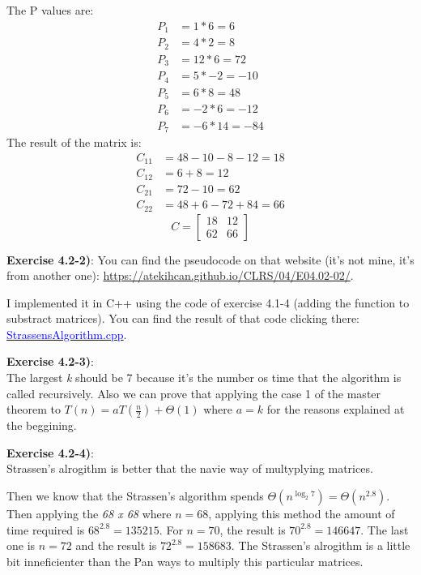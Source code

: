 \documentclass{article}
\newcounter{exercise}[section]   %
\begin{document}
The P values are:
\begin{align*}
    P_1 &= 1 * 6 = 6 \\ P_2 &= 4 * 2 = 8 \\ P_3 &= 12 * 6 = 72 \\ P_4 &= 5 * -2 = -10 \\
    P_5 &= 6 * 8 = 48 \\ P_6 &= -2 * 6 = -12 \\ P_7 &= -6 * 14 = -84
\end{align*}
\newpage
The result of the matrix is:
\begin{align*}
    C_{11} &= 48 - 10 - 8 - 12 = 18 \\ C_{12} &= 6 + 8 = 12 \\
    C_{21} &= 72 - 10 = 62 \\ C_{22} &= 48 + 6 -72 + 84 = 66
\end{align*}
\[
C =
\begin{bmatrix}
    18 & 12 \\
    62 & 66
\end{bmatrix}
\]

\textbf{Exercise 4.2-2)}:
You can find the pseudocode on that website (it's not mine, it's from another one):
\href{https://atekihcan.github.io/CLRS/04/E04.02-02/}{https://atekihcan.github.io/CLRS/04/E04.02-02/}.

I implemented it in C++ using the code of exercise 4.1-4 (adding the function to substract matrices).
You can find the result of that code clicking there: \href{https://github.com/Graburr/Algorithms_CLRS_4ed_solutions/blob/main/chapter1/Divide_%26_Conquer/StrassensAlgorithm.cpp}
{\textcolor{Blue}{StrassensAlgorithm.cpp}}.

\textbf{Exercise 4.2-3)}:\\
The largest \textit{k} should be 7 because it's the number os time that the algorithm is 
called recursively. Also we can prove that applying the case 1 of the master theorem to 
\(T(n) = aT\left(\frac{n}{2}\right) + \Theta(1)\) where \(a = k\) for the reasons explained 
at the beggining.

\textbf{Exercise 4.2-4)}:\\
Strassen's alrogithm is better that the navie way of multyplying matrices.

Then we know that the Strassen's algorithm spends \(\Theta(n^{\log_2 7}) = \Theta
(n^{2.8})\). Then applying the \textit{68 x 68} where \(n = 68\), applying this method the
amount of time required is \(68^{2.8} = 135215\). For \(n = 70\), the result is \(70^{2.8}
 = 146647\). The last one is \(n = 72\) and the result is \(72^{2.8} = 158683\). The Strassen's
alrogithm is a little bit inneficienter than the Pan ways to multiply this particular
matrices. 
\end{document}
